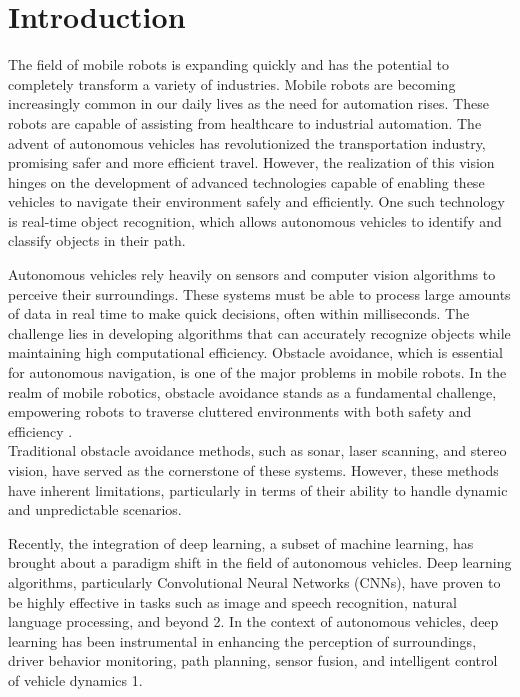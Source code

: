 \section{Introduction}

The field of mobile robots is expanding quickly and has the potential to completely transform a variety of industries. Mobile robots are becoming increasingly common in our daily lives as the need for automation rises. These robots are capable of assisting from healthcare to industrial automation. The advent of autonomous vehicles has revolutionized the transportation industry, promising safer and more efficient travel. However, the realization of this vision hinges on the development of advanced technologies capable of enabling these vehicles to navigate their environment safely and efficiently. One such technology is real-time object recognition, which allows autonomous vehicles to identify and classify objects in their path. 

Autonomous vehicles rely heavily on sensors and computer vision algorithms to perceive their surroundings. These systems must be able to process large amounts of data in real time to make quick decisions, often within milliseconds. The challenge lies in developing algorithms that can accurately recognize objects while maintaining high computational efficiency.  Obstacle avoidance, which is essential for autonomous navigation, is one of the major problems in mobile robots. In the realm of mobile robotics, obstacle avoidance stands as a fundamental challenge, empowering robots to traverse cluttered environments with both safety and efficiency \cite{wenzel2021vision}.\\
 Traditional obstacle avoidance methods, such as sonar, laser scanning, and stereo vision, have served as the cornerstone of these systems. However, these methods have inherent limitations, particularly in terms of their ability to handle dynamic and unpredictable scenarios.

Recently, the integration of deep learning, a subset of machine learning, has brought about a paradigm shift in the field of autonomous vehicles. Deep learning algorithms, particularly Convolutional Neural Networks (CNNs), have proven to be highly effective in tasks such as image and speech recognition, natural language processing, and beyond 2. In the context of autonomous vehicles, deep learning has been instrumental in enhancing the perception of surroundings, driver behavior monitoring, path planning, sensor fusion, and intelligent control of vehicle dynamics 1.


